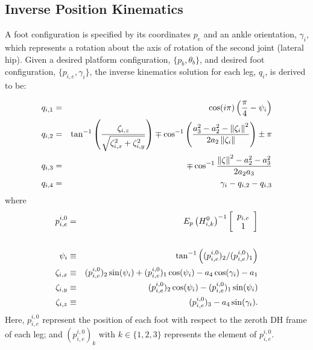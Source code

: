 		




		\subsection{Inverse Position Kinematics}

			A foot configuration is specified by its coordinates ${p}_{e}$ and an ankle orientation, $\gamma_{i}$,  which represents a rotation about the axis of rotation of the second joint (lateral hip). Given a desired platform configuration, $\{ {p}_{b}, \theta_{b} \}$,  and desired \Ith foot configuration,  $\{ {p}_{i,e} , \gamma_{i} \}$, the inverse kinematics solution for each \Ith leg, ${q}_{i}$, is derived to be:

				\begin{eqnarray}
					q_{i,1} &=& \cos(i\pi) \left( \frac{\pi}{4} - \psi_{i} \right) \nonumber\\
					q_{i,2} &=&	\tan^{-1} \left(\frac{\zeta_{i,z}}{\sqrt{\zeta_{i,x}^2+\zeta_{i,y}^2}}\right) \mp \cos^{-1}\left(\frac{a_{3}^2-a_{2}^2-\left\lVert\zeta_{i}\right\rVert^2}{2 a_{2} \left\lVert\zeta_{i}\right\rVert }\right) \pm \pi 	\nonumber\\
					q_{i,3} &=&	\mp \cos^{-1}\frac{\left\lVert\zeta\right\rVert^2-a_{2}^2-a_{3}^2}{2 a_{2} a_{3}} \nonumber\\
					q_{i,4} &=&	\gamma_{i} - q_{i,2} - q_{i,3}	
				\end{eqnarray}
				where
				\begin{eqnarray}
					{p}_{i,e}^{i,0} &=&
					E_{p} 
					\left( {H}_{i,k}^{0} \right) ^{-1}
					\left[
						\begin{array}{c}
							{p}_{i,e} 		\\
							1 				\\ 	
						\end{array}
					\right]	\nonumber\\																						\nonumber\\
					\psi_{i} 	&\equiv&	\tan^{-1}\left( ({p}_{i,e}^{i,0})_{2}/({p}_{i,e}^{i,0})_{1} \right)												\nonumber\\
					\zeta_{i,x} &\equiv& 	({p}_{i,e}^{i,0})_{2} \sin(\psi_{i}) + ({p}_{i,e}^{i,0})_{1} \cos(\psi_{i}) - a_{4} \cos(\gamma_{i}) - a_{1} 						\nonumber\\
					\zeta_{i,y} &\equiv& 	({p}_{i,e}^{i,0})_{2} \cos(\psi_{i}) - ({p}_{i,e}^{i,0})_{1} \sin(\psi_{i}) 											\nonumber\\
					\zeta_{i,z}	&\equiv&  	({p}_{i,e}^{i,0})_{3} - a_{4} \sin(\gamma_{i}) .
				\end{eqnarray}
			Here, ${p}_{i,e}^{i,0}$ represent the position of each \Ith foot with respect to the zeroth DH frame of each \Ith leg; and $({p}_{i,e}^{i,0})_{k}$ with $k\in\{1,2,3\}$ represents the \Kth element of ${p}_{i,e}^{i,0}$.

